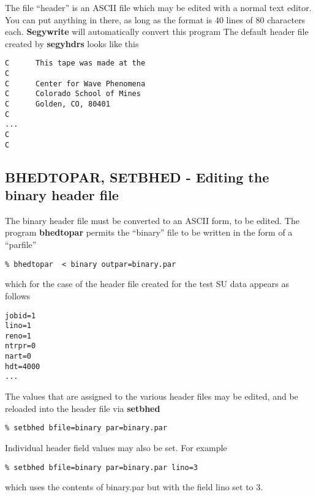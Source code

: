 {{{The file ``header'' is an ASCII file which may be edited with a
normal text editor. You can put anything in there, as long as the
format is 40 lines of 80 characters each. {\bf Segywrite\/} will
automatically convert this program 
The default header file created by {\bf segyhdrs\/} looks like this
{\small\begin{verbatim}
C      This tape was made at the                                               
C                                                                              
C      Center for Wave Phenomena                                               
C      Colorado School of Mines                                                
C      Golden, CO, 80401                                                       
C                                                                              
...                                                                              
C                                                                              
C                                                                              
\end{verbatim}}\noindent

\subsection{BHEDTOPAR, SETBHED - Editing the binary header file}
The binary header file must be converted to an ASCII form, to be
edited.  The program {\bf bhedtopar\/} permits the ``binary'' file
to be written in the form of a ``parfile''
{\small\begin{verbatim}
% bhedtopar  < binary outpar=binary.par
\end{verbatim}}\noindent
which for the case of the header file created for the test SU data
appears as follows
{\small\begin{verbatim}
jobid=1
lino=1
reno=1
ntrpr=0
nart=0
hdt=4000
...
\end{verbatim}}\noindent
The values that are assigned to the various header files may be
edited, and be reloaded into the header file via {\bf setbhed\/}
{\small\begin{verbatim}
% setbhed bfile=binary par=binary.par
\end{verbatim}}\noindent
Individual header field values may also be set. For example
{\small\begin{verbatim}
% setbhed bfile=binary par=binary.par lino=3
\end{verbatim}}\noindent
which uses the contents of binary.par but with the field lino set to 3.

}}}
